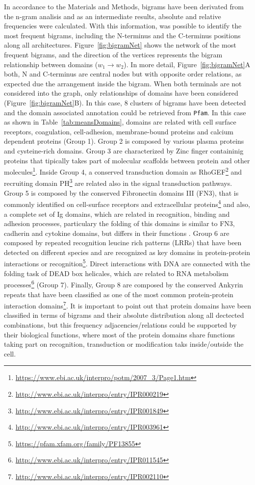 \documentclass[11pt]{article}
\begin{document}
In accordance to the Materials and Methods, bigrams have been derivated from the
n-gram analisis and as an intermediate results, absolute and relative frequencies
were calculated. With this information, was possible to identify the most 
frequent bigrams, including the N-terminus and the C-terminus positions along all 
architectures. Figure~\ref{fig:bigramNet} shows the network of the most
frequent bigrams, and the direction of the vertices represents the bigram 
relationship between domains ($w_1 \rightarrow w_2$). In more detail,
Figure~\ref{fig:bigramNet}A both, N and C-terminus are central nodes 
but with opposite order relations, as expected due the arrangement inside the bigram. 
When both terminals are not considered into the graph, only relationships of 
domains have been considered (Figure~\ref{fig:bigramNet}B). In this case, 
$8$ clusters of bigrams have been detected and the domain associated annotation 
could be retrieved from \texttt{Pfam}. In this case as shown in 
Table~\ref{tab:meansDomains}, domains are related with cell surface receptors, 
coagulation, cell-adhesion, membrane-bound proteins and calcium dependent 
proteins (Group 1). Group 2 is composed by various plasma proteins and cysteine-rich 
domains. Group 3 are characterized by Zinc finger containinig proteins
that tipically takes part of molecular scaffolds between protein and other 
molecules\footnote{\url{https://www.ebi.ac.uk/interpro/potm/2007_3/Page1.htm}}. Inside Group 4, a conserved
transduction domain as RhoGEF\footnote{\url{http://www.ebi.ac.uk/interpro/entry/IPR000219}} 
and recruiting domain PH\footnote{\url{http://www.ebi.ac.uk/interpro/entry/IPR001849}}
are related also in the signal transduction pathways. Group 5 is composed by the conserved
Fibronectin domains III (FN3), that is commonly identified on cell-surface receptors 
and extracellular proteins\footnote{\url{http://www.ebi.ac.uk/interpro/entry/IPR003961}} 
and also, a complete set of Ig domains, which are related in recognition, binding and 
adhesion processes, particulary the folding of this domains is similar to FN3, cadherin and 
cytokine domains, but differs in their functions \cite{Barclay:2003}. Group 6 are
composed by repeated recognition leucine rich patterns (LRRs) that have been 
detected on different species and are recognized as key domains in protein-protein 
interactions or recognition\footnote{\url{https://pfam.xfam.org/family/PF13855}}. 
Direct interactions with DNA are connected with the folding task of DEAD box helicales, 
which are related to RNA metabolism processes\footnote{\url{http://www.ebi.ac.uk/interpro/entry/IPR011545}}
(Group 7). Finally, Group 8 are composed by the conserved Ankyrin repeats that have
been classified as one of the most common protein-protein interaction 
domains\footnote{\url{http://www.ebi.ac.uk/interpro/entry/IPR002110}}. 
It is important to point out that protein domains have been classified in terms of 
bigrams and their absolute distribution along all dectected combinations, but this
frequency adjacencies/relations could be supported by their biological functions, where
most of the protein domains share functions taking part on recognition, 
transduction or modification taks inside/outside the cell.
\end{document}

